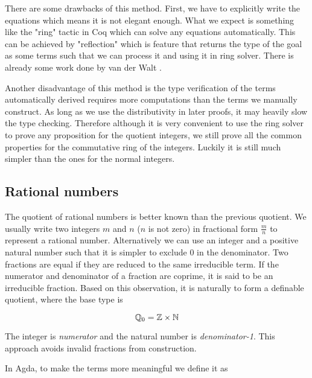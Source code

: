 There are some drawbacks of this method. First, we have to explicitly
write the equations which means it is not elegant enough. What we
expect is something like the "ring" tactic in Coq which can solve any
equations automatically. This can be achieved by "reflection" which is
feature that returns the type of the goal as some terms such that we
can process it and using it in ring solver. There is already some work
done by van der Walt \cite{van2012reflection}.

Another disadvantage of this method is the type verification of the
terms automatically derived requires more computations than the terms
we manually construct. As long as we use the distributivity in later
proofs, it may heavily slow the type checking. Therefore although
it is very convenient to use the ring solver to prove any proposition for the quotient
integers, we still prove all the common properties for the commutative
ring of the integers. Luckily it is still much simpler than the ones
for the normal integers.


\subsection{Rational numbers}

The quotient of rational numbers is better known than the previous
quotient. We usually write two integers $m$ and $n$ ($n$ is not zero) in
fractional form $\frac{m}{n}$ to represent a rational number. Alternatively we
can use an integer and a positive natural number such that it is
simpler to exclude 0 in the denominator. Two fractions are equal if
they are reduced to the same irreducible term. If the numerator and
denominator of a fraction are coprime, it is said to be an irreducible
fraction. Based on this observation, it is naturally to form a definable quotient, where the base type is 

$$\mathbb{Q}_0 = \mathbb{Z} \times \mathbb{N}$$

The integer is \emph{numerator} and the natural number is \emph{denominator-1}. This approach avoids invalid fractions from construction. 

In Agda, to make the terms more meaningful we define it as

\begin{code}
\\
\>  \AgdaSymbol{:}  \<%
\\
\>[-1]\<[2]%
\>[2] \AgdaSymbol{:} \AgdaSymbol{(} \AgdaSymbol{:} \AgdaSymbol{)}  \AgdaSymbol{(} \AgdaSymbol{:} \AgdaSymbol{)}  \<%
\\
\end{code}

